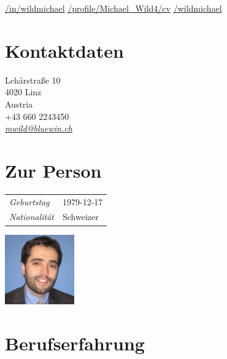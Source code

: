 \documentclass[line,11pt,a4paper]{../resume}
\newcommand{\mail}[1]{\textsl{\href{mailto:#1}{#1}}}
\begin{document}
\begin{resume}
\vspace{-4mm}
\-\hspace{-12.3mm}\begin{minipage}{15cm}
\href{https://linkedin.com/in/wildmichael}{\faLinkedinSquare/in/wildmichael}\quad
\href{https://xing.com/profile/Michael_Wild4/cv}{\faXingSquare/profile/Michael\_Wild4/cv}\quad
\href{https://github.com/wildmichael}{\faGithubSquare/wildmichael}
\end{minipage}


\begin{multicols}{3}

\section{\mysidestyle Kontaktdaten}\vspace{0.9mm}

Leh\'{a}rstra{\ss}e 10 \\
4020 Linz \\
Austria \\
+43 660 2243450 \\
\mail{mwild@bluewin.ch}\\

\columnbreak

\section{\mysidestyle Zur Person}\vspace{2mm}

\begin{tabular}{@{}ll}
\textsl{Geburtstag} & 1979-12-17 \\
\textsl{Nationalität}   & Schweizer
\end{tabular}

\columnbreak
\vspace*{-9mm}\hfill\includegraphics[width=30mm]{../mwild}

\end{multicols}

\section{\mysidestyle Berufserfahrung}\vspace{2mm}


\end{resume}
\end{document}
